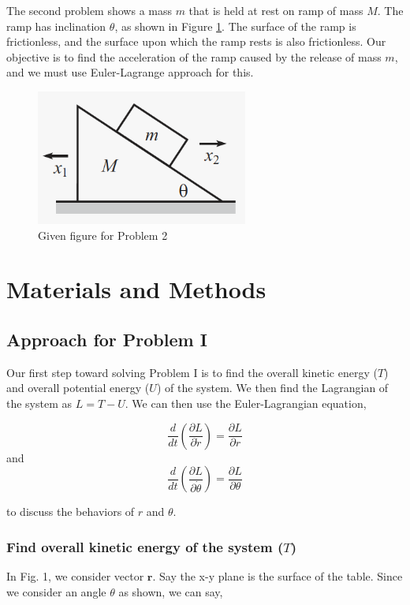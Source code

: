 \documentclass[conference]{IEEEtran}
\begin{document}
The second problem shows a mass $m$ that is held at rest on ramp of mass $M$. The ramp has inclination
$\theta$, as shown in Figure \ref{problem-2-given-fig}. The surface of the ramp is frictionless, and the
surface upon which the ramp rests is also frictionless. Our objective is to find the acceleration of
the ramp caused by the release of mass $m$, and we must use Euler-Lagrange approach for this.

\begin{figure}
    \centering
    \includegraphics[scale=0.35]{problem-2-given-fig.png}
    \caption{Given figure for Problem 2}
    \label{problem-2-given-fig}
\end{figure}

\section{Materials and Methods}

\subsection{Approach for Problem I}

Our first step toward solving Problem I is to find the overall kinetic energy ($T$) and
overall potential energy ($U$) of the system. We then find the Lagrangian of the system
as $L = T - U$. We can then use the Euler-Lagrangian equation,

\begin{equation}
    \frac{d}{dt} \left(\frac{\partial L}{\partial \dot{r}}\right) = \frac{\partial L}{ \partial r}
\end{equation}
and
\begin{equation}
    \frac{d}{dt} \left(\frac{\partial L}{\partial \dot{\theta}}\right) = \frac{\partial L}{ \partial \theta}
\end{equation}

to discuss the behaviors of $r$ and $\theta$.\\

\subsubsection{Find overall kinetic energy of the system ($T$)}
In Fig. 1, we consider vector $\textbf{r}$. Say the x-y plane is the surface
of the table. Since we consider an angle $\theta$ as shown, we can say,
\end{document}

